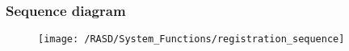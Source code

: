 \subsubsection{Sequence diagram}
\begin{figure}[!ht]
  \centering
  \vspace{0.2cm}
  \texttt{[image: /RASD/System\_Functions/registration\_sequence]}\\
  \vspace{0.4cm}
  \label{fig:registration_sequence} 
\end{figure}
